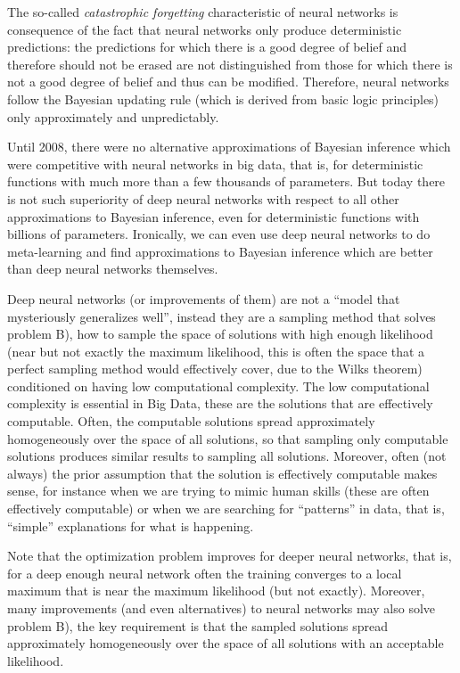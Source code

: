 \documentclass[11pt]{book}
\begin{document}
The so-called \emph{catastrophic forgetting} characteristic of neural
networks\cite{kaplanis_continual_2018} is consequence of the fact that neural
networks only produce deterministic predictions: the predictions for
which there is a good degree of belief and therefore should not be
erased are not distinguished from those for which there is not a good
degree of belief and thus can be modified. Therefore, neural networks
follow the Bayesian updating rule (which is derived from basic logic
principles) only approximately and unpredictably.

Until 2008\cite{beskos_mcmc_2008}, there were no alternative approximations of
Bayesian inference which were competitive with neural networks in big
data, that is, for deterministic functions with much more than a few
thousands of parameters. But today there is not such superiority of deep
neural networks with respect to all other approximations to Bayesian
inference, even for deterministic functions with billions of
parameters\cite{vollmer_dimension-independent_2015}\cite{chen_dimension-robust_2018}\cite{cui_prior_2022}\cite{villa_hippylib_2021}\cite{beskos_geometric_2017}\cite{coullon_ensemble_2021}. Ironically, we can even use deep neural networks to do
meta-learning and find approximations to Bayesian inference which are
better than deep neural networks
themselves\cite{muller_transformers_2022}.

Deep neural networks (or improvements of
them\cite{carreira_hip_2022})
are not a ``model that mysteriously generalizes well'', instead they are
a sampling method that solves problem B), how to sample the space of
solutions with high enough likelihood (near but not exactly the maximum
likelihood\cite{benjamin_improving_2018}, this is often the space that a perfect sampling method
would effectively cover, due to the Wilks theorem) conditioned on having
low computational complexity. The low computational complexity is
essential in Big Data, these are the solutions that are effectively
computable. Often, the computable solutions spread approximately
homogeneously over the space of all solutions, so that sampling only
computable solutions produces similar results to sampling all solutions.
Moreover, often (not always) the prior assumption that the solution is
effectively computable makes sense, for instance when we are trying to
mimic human skills (these are often effectively computable) or when we
are searching for ``patterns'' in data, that is, ``simple'' explanations
for what is happening.

Note that the optimization problem improves for deeper neural
networks\cite{bartlett_deep_2021}, that is, for a deep enough neural network often the
training converges to a local maximum that is near the maximum
likelihood (but not exactly). Moreover, many
improvements\cite{carreira_hip_2022} (and even
alternatives\cite{alavisamani_application_2018}) to neural networks may also solve problem B), the
key requirement is that the sampled solutions spread approximately
homogeneously over the space of all solutions with an acceptable
likelihood.
\end{document}
